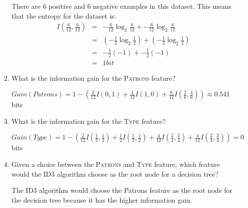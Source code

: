 \documentclass[solution]{ditpaper}
\begin{document}
\begin{enumerate}
\begin{enumerate}
			\begin{answer}
					There are 6 positive and 6 negative examples in this dataset. This means that the entropy for the dataset is:
					\begin{eqnarray*}
						I(\frac{6}{12}, \frac{6}{12}) &=& -\frac{6}{12}\log_2\frac{6}{12} + -\frac{6}{12}\log_2 \frac{6}{12}\\
									~ &=& (-\frac{1}{2}\log_2\frac{1}{2}) + (-\frac{1}{2}\log_2\frac{1}{2}) \\ 
						~ &=&  -\frac{1}{2}(-1) + -\frac{1}{2}(-1) \\
						 ~ &=&  1bit
					\end{eqnarray*}			
			\end{answer}
		\item What is the information gain for the \textsc{Patrons} feature?
			\begin{answer}
							$Gain(Patrons)=1- ( \frac{2}{12}I(0,1) + \frac{4}{12}I(1,0) + \frac{6}{12}I(\frac{2}{6},\frac{4}{6}) ) \approx 0.541$ bits
			\end{answer}
		\item What is the information gain for the \textsc{Type} feature?
			\begin{answer}
							$Gain(Type)=1- ( \frac{2}{12}I(\frac{1}{2},\frac{1}{2}) + \frac{1}{2}I(\frac{1}{2},\frac{1}{2}) + \frac{4}{12}I(\frac{2}{4},\frac{2}{4})+ \frac{4}{12}I(\frac{2}{4},\frac{2}{4}) ) = 0$ bits
			\end{answer}
		\item Given a choice between the \textsc{Patrons} and \textsc{Type} feature, which feature would the ID3 algorithm choose as the root node for a decision tree?
			\begin{answer}
					The ID3 algorithm would choose the Patrons feature as the root node for the decision tree because it has the higher information gain.
			\end{answer}
	\end{enumerate}
\end{enumerate}

\newpage 
\end{document}

